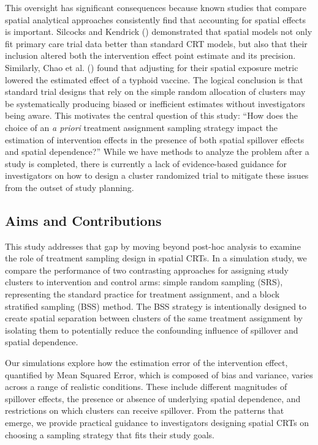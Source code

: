 \documentclass[
  12pt,
  prelim]{bios-prelim}
\begin{document}
This oversight has significant consequences because known studies that
compare spatial analytical approaches consistently find that accounting
for spatial effects is important. Silcocks and Kendrick
() demonstrated that spatial
models not only fit primary care trial data better than standard CRT
models, but also that their inclusion altered both the intervention
effect point estimate and its precision. Similarly, Chao et al.
() found that adjusting for
their spatial exposure metric lowered the estimated effect of a typhoid
vaccine. The logical conclusion is that standard trial designs that rely
on the simple random allocation of clusters may be systematically
producing biased or inefficient estimates without investigators being
aware. This motivates the central question of this study: ``How does the
choice of an \emph{a priori} treatment assignment sampling strategy
impact the estimation of intervention effects in the presence of both
spatial spillover effects and spatial dependence?'' While we have
methods to analyze the problem after a study is completed, there is
currently a lack of evidence-based guidance for investigators on how to
design a cluster randomized trial to mitigate these issues from the
outset of study planning.

\subsection{Aims and Contributions}\label{aims-and-contributions}

This study addresses that gap by moving beyond post-hoc analysis to
examine the role of treatment sampling design in spatial CRTs. In a
simulation study, we compare the performance of two contrasting
approaches for assigning study clusters to intervention and control
arms: simple random sampling (SRS), representing the standard practice
for treatment assignment, and a block stratified sampling (BSS) method.
The BSS strategy is intentionally designed to create spatial separation
between clusters of the same treatment assignment by isolating them to
potentially reduce the confounding influence of spillover and spatial
dependence.

Our simulations explore how the estimation error of the intervention
effect, quantified by Mean Squared Error, which is composed of bias and
variance, varies across a range of realistic conditions. These include
different magnitudes of spillover effects, the presence or absence of
underlying spatial dependence, and restrictions on which clusters can
receive spillover. From the patterns that emerge, we provide practical
guidance to investigators designing spatial CRTs on choosing a sampling
strategy that fits their study goals.
\end{document}
